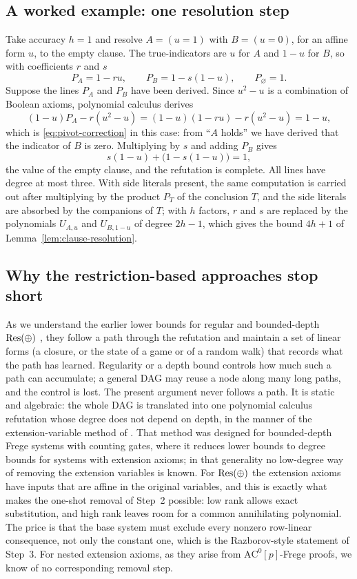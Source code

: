 \subsection{A worked example: one resolution step}
Take accuracy \(h=1\) and resolve \(A=(u=1)\) with \(B=(u=0)\), for an
affine form \(u\), to the empty clause. The true-indicators are \(u\) for
\(A\) and \(1-u\) for \(B\), so with coefficients \(r\) and \(s\)
\[
 P_A=1-ru,\qquad P_B=1-s(1-u),\qquad P_\varnothing=1 .
\]
Suppose the lines \(P_A\) and \(P_B\) have been derived. Since
\(u^2-u\) is a combination of Boolean axioms, polynomial calculus derives
\[
 (1-u)P_A-r(u^2-u)=(1-u)(1-ru)-r(u^2-u)=1-u ,
\]
which is \eqref{eq:pivot-correction} in this case: from ``\(A\) holds'' we
have derived that the indicator of \(B\) is zero. Multiplying by \(s\) and
adding \(P_B\) gives
\[
 s(1-u)+\bigl(1-s(1-u)\bigr)=1 ,
\]
the value of the empty clause, and the refutation is complete. All lines
have degree at most three. With side literals present, the same
computation is carried out after multiplying by the product \(P_T\) of the
conclusion \(T\), and the side literals are absorbed by the companions of
\(T\); with \(h\) factors, \(r\) and \(s\) are replaced by the polynomials
\(U_{A,u}\) and \(U_{B,1-u}\) of degree \(2h-1\), which gives the bound
\(4h+1\) of Lemma~\ref{lem:clause-resolution}.

\subsection{Why the restriction-based approaches stop short}
As we understand the earlier lower bounds for regular and bounded-depth
\(\mathrm{Res}(\oplus)\) \cite{EGI25,BCD24,BC25,BI25,BCBI26,AI25,EI25}, they follow a path
through the refutation and maintain a set of linear forms (a closure, or
the state of a game or of a random walk) that records what the path has
learned. Regularity or a depth bound controls how much such a path can
accumulate; a general DAG may reuse a node along many long paths, and the
control is lost. The present argument never follows a path. It is static
and algebraic: the whole DAG is translated into one polynomial calculus
refutation whose degree does not depend on depth, in the manner of the
extension-variable method of \cite{BIKPRS}. That method was designed for
bounded-depth Frege systems with counting gates, where it reduces lower
bounds to degree bounds for systems with extension axioms; in that
generality no low-degree way of removing the extension variables is known. For
\(\mathrm{Res}(\oplus)\) the extension axioms have inputs that are affine in the original
variables, and this is exactly what makes the one-shot removal of Step~2
possible: low rank allows exact substitution, and high rank leaves room
for a common annihilating polynomial. The price is that the base system
must exclude every nonzero row-linear consequence, not only the constant
one, which is the Razborov-style statement of Step~3. For nested
extension axioms, as they arise from \(\mathrm{AC}^0[p]\)-Frege proofs, we
know of no corresponding removal step.
